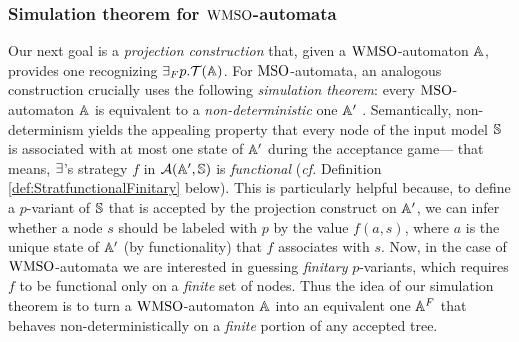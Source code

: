 \subsubsection{Simulation theorem for $\mathrm{WMSO}$-automata}\label{sec:simulationwmso}

\noindent Our next goal is a \emph{projection construction} that, given
a $\mathrm{WMSO}$-automaton $\mathbb{A}$, provides one recognizing ${{\exists}_F p}.\mathcal{T}(\mathbb{A})$. For $\mathrm{MSO}$-automata, an analogous construction crucially uses the following \emph{simulation theorem}: every
$\mathrm{MSO}$-automaton $\mathbb{A}$ is equivalent to a \emph{non-deterministic} one $\mathbb{A}'$ \cite{Walukiewicz96}.
Semantically, non-determinism yields the appealing property that every node of the input model $\mathbb{S}$ is associated with at most one state of $\mathbb{A}'$ during the acceptance game--- that means, $\exists$'s strategy $f$ in $\mathcal{A}(\mathbb{A}',\mathbb{S})$ is \emph{functional} (\emph{cf.} Definition \ref{def:StratfunctionalFinitary} below). This is particularly helpful because, to define a $p$-variant of $\mathbb{S}$
that is accepted by the projection construct on $\mathbb{A}'$, we
can infer whether a node $s$ should be labeled with $p$ by the value $f(a,s)$, where $a$ is the unique state of $\mathbb{A}'$ (by functionality) that $f$ associates with $s$. Now, in the case of $\mathrm{WMSO}$-automata we are interested in guessing
\emph{finitary} $p$-variants, which requires $f$ to be functional only on a \emph{finite} set of nodes. Thus the idea of our simulation theorem is to turn a $\mathrm{WMSO}$-automaton $\mathbb{A}$ into an equivalent one $\mathbb{A}^{F}$ that behaves non-deterministically on a \emph{finite} portion of any accepted tree.

